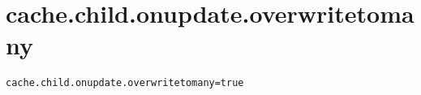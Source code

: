 \section{cache.child.onupdate.overwritetomany}
\label{configuration:CacheChildOnupdateOverwritetomany}
\AvailableInJavaAndCsharp{\TODO}
\begin{lstlisting}[style=Props,caption={Usage example for \textit{cache.child.onupdate.overwritetomany}}]
cache.child.onupdate.overwritetomany=true
\end{lstlisting}